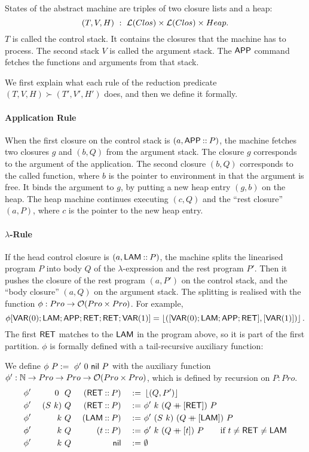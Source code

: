 States of the abstract machine are triples of two closure lists and a heap:
\[
  (T, V, H) ~:~ \mathcal{L}(Clos) \times \mathcal{L}(Clos) \times Heap.
\]
$T$ is called the control stack.  It contains the closures that the machine has to process.  The second stack $V$ is called the argument stack.  The
$\mathsf{APP}$ command fetches the functions and arguments from that stack.


We first explain what each rule of the reduction predicate $(T,V,H) \succ (T',V',H')$ does, and then we define it formally.


\paragraph{Application Rule}
When the first closure on the control stack is $(a, \mathsf{APP} \mathbin{::} P)$, the machine fetches two closures $g$ and $(b,Q)$ from the argument stack.  The
closure $g$ corresponds to the argument of the application.  The second closure $(b,Q)$ corresponds to the called function, where $b$ is the pointer
to environment in that the argument is free.  It binds the argument to $g$, by putting a new heap entry $(g,b)$ on the heap.  The heap machine
continues executing $(c,Q)$ and the ``rest closure'' $(a,P)$, where $c$ is the pointer to the new heap entry.


\paragraph{$\lambda$-Rule}
If the head control closure is $(a, \mathsf{LAM} \mathbin{::} P)$, the machine splits the linearised program $P$ into body $Q$ of the $\lambda$-expression and
the rest program $P'$.  Then it pushes the closure of the rest program $(a,P')$ on the control stack, and the ``body closure'' $(a,Q)$ on the argument
stack.  The splitting is realised with the function $\phi : Pro \rightarrow \mathcal{O}(Pro \times Pro)$.  For example, {\small
  \[
    \phi[\mathsf{VAR}(0); \mathsf{LAM}; \mathsf{APP}; \mathsf{RET}; \mathsf{RET}; \mathsf{VAR}(1)] = \left\lfloor {([\ensuremath{\mathsf{VAR}}(0); \ensuremath{\mathsf{LAM}}; \ensuremath{\mathsf{APP}}; \ensuremath{\mathsf{RET}}], [\ensuremath{\mathsf{VAR}}(1)])} \right\rfloor.
  \]
}%
The first $\mathsf{RET}$ matches to the $\mathsf{LAM}$ in the program above, so it is part of the first partition.  $\phi$ is formally defined with a
tail-recursive auxiliary function:
\begin{definition}[$\phi$][jumpTarget]
  \label{def:jumpTarget}
  We define $\phi~P :=~ \phi'~0~\mathsf{nil}~P$ with the auxiliary function $\phi' : \mathbb{N} \rightarrow Pro \rightarrow Pro \rightarrow \mathcal{O}(Pro \times Pro)$, which is defined by
  recursion on $P:Pro$.
  \begin{alignat*}{4}
    &\phi'&~0~   &~Q&~(\mathsf{RET} \mathbin{::} P) &&~:=~& \left\lfloor {(Q,P')} \right\rfloor \\
    &\phi'&~(S~k)&~Q&~(\mathsf{RET} \mathbin{::} P) &&~:=~& \phi'~k~(Q \mathbin{+\mkern-10mu+} [\mathsf{RET}])~P \\
    &\phi'&~k    &~Q&~(\mathsf{LAM} \mathbin{::} P) &&~:=~& \phi'~(S~k)~(Q \mathbin{+\mkern-10mu+} [\mathsf{LAM}])~P \\
    &\phi'&~k    &~Q&~(t        \mathbin{::} P) &&~:=~& \phi'~k~(Q \mathbin{+\mkern-10mu+} [t])~P \qquad \text{if $t \neq \mathsf{RET} \neq \mathsf{LAM}$} \\
    &\phi'&~k    &~Q&~              \mathsf{nil} &&~:=~& \emptyset
  \end{alignat*}
\end{definition}


